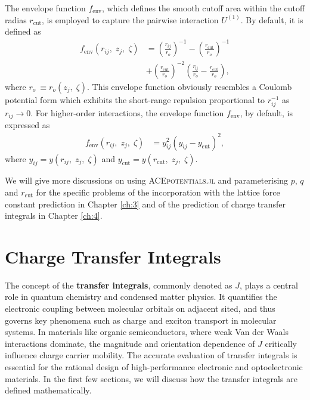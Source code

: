 The envelope function $f_{\text{env}}$, which defines the smooth cutoff area within the cutoff radias $r_{\text{cut}}$, is employed to capture the pairwise interaction $U^{(1)}$.
By default, it is defined as
\begin{equation} \label{equ:2.83}
\begin{split}
f_{\text{env}}(r_{ij},\;z_{j},\;\zeta) &= \left(
    \frac{r_{ij}}{r_{o}}
    \right)^{-1} - \left(
    \frac{r_{\text{cut}}}{r_{o}}
    \right)^{-1}\\
    &
    + \left(
    \frac{r_{\text{cut}}}{r_{o}}
    \right)^{-2}\left(
    \frac{r_{\text{ij}}}{r_{o}}
    -\frac{r_{\text{cut}}}{r_{o}}
    \right), 
\end{split}
\end{equation}
where  $r_{o} ~\equiv r_{o}(z_{j},\;\zeta)$.
This envelope function obviously resembles a Coulomb potential form which exhibits the  short-range repulsion proportional to $r_{ij}^{-1}$ as $r_{ij}\rightarrow 0$.
For higher-order interactions, the envelope function $f_{\text{env}}$, by default, is expressed as  
\begin{equation} \label{equ:2.84}
\begin{split}
f_{\text{env}}(r_{ij},\;z_{j},\;\zeta) &= y_{ij}^{2}(y_{ij}-y_{\text{cut}})^{2},
\end{split}
\end{equation}
where $y_{ij}=y(r_{ij},\;z_{j},\;\zeta)$ and $y_{\text{cut}}=y(r_{\text{cut}},\;z_{j},\;\zeta)$.

We will give more discussions on using \textsc{ACEpotentials.jl} and parameterising $p$, $q$ and $r_{\text{cut}}$ for the specific problems of the incorporation with the lattice force constant prediction in Chapter \ref{ch:3} and of the prediction of charge transfer integrals in Chapter \ref{ch:4}.



\section{Charge Transfer Integrals} \label{sec:2.6}
The concept of the \textbf{transfer integrals}, commonly denoted as $J$, plays a central role in quantum chemistry and condensed matter physics.
It quantifies the electronic coupling between molecular orbitals on adjacent sited, and thus governs key phenomena such as charge and exciton transport in molecular systems.
In materials like organic semiconductors, where weak Van der Waals interactions dominate, the magnitude and orientation dependence of $J$ critically influence charge carrier mobility.
The accurate evaluation of transfer integrals is essential for the rational design of high-performance electronic and optoelectronic materials.
In the first few sections, we will discuss how the transfer integrals are defined mathematically.


